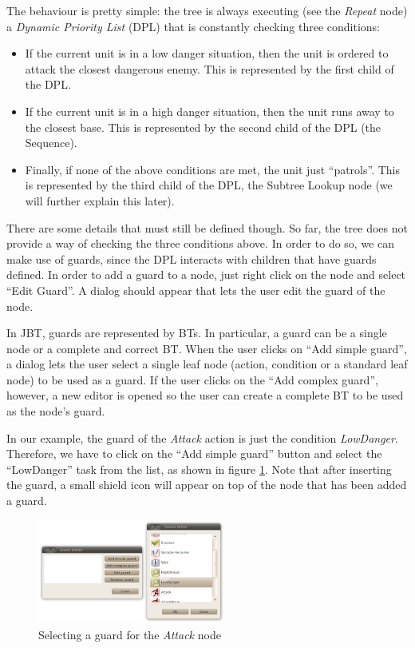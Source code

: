 \documentclass[a4paper]{article}
\begin{document}
The behaviour is pretty simple: the tree is always executing (see the \textit{Repeat} node) a \textit{Dynamic Priority List} (DPL) that is constantly checking three conditions:

\begin{itemize}
  \item If the current unit is in a low danger situation, then the unit is ordered to attack the closest dangerous enemy. This is represented by the first child of the DPL.
  \item If the current unit is in a high danger situation, then the unit runs away to the closest base. This is represented by the second child of the DPL (the Sequence).
  \item Finally, if none of the above conditions are met, the unit just ``patrols''. This is represented by the third child of the DPL, the Subtree Lookup node (we will further explain this later).
\end{itemize}

There are some details that must still be defined though. So far, the tree does not provide a way of checking the three conditions above. In order to do so, we can make use of guards, since the DPL interacts with children that have guards defined. In order to add a guard to a node, just right click on the node and select ``Edit Guard''. A dialog should appear that lets the user edit the guard of the node.

In JBT, guards are represented by BTs. In particular, a guard can be a single node or a complete and correct BT. When the user clicks on ``Add simple guard'', a dialog lets the user select a single leaf node (action, condition or a standard leaf node) to be used as a guard. If the user clicks on the ``Add complex guard'', however, a new editor is opened so the user can create a complete BT to be used as the node's guard. 

In our example, the guard of the \textit{Attack} action is just the condition \textit{LowDanger}. Therefore, we have to click on the ``Add simple guard'' button and select the ``LowDanger'' task from the list, as shown in figure \ref{fig:LowDangerGuard}. Note that after inserting the guard, a small shield icon will appear on top of the node that has been added a guard.

\begin{figure}
 \centering
 \includegraphics[width=0.55\textwidth]{./Images/LowDangerGuard.png}
 \caption{Selecting a guard for the \textit{Attack} node}
 \label{fig:LowDangerGuard}
\end{figure}
\end{document}
